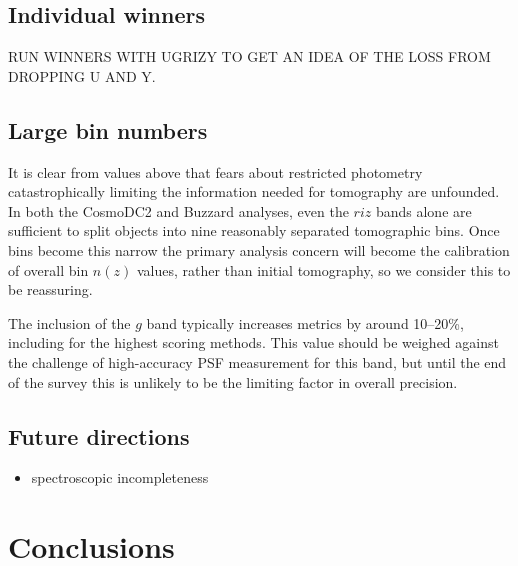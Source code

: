 \documentclass[twocolumn,twocolappendix]{aastex63}
\begin{document}
\subsection{Individual winners}

RUN WINNERS WITH UGRIZY TO GET AN IDEA OF THE LOSS FROM DROPPING U AND Y.

\subsection{Large bin numbers}

It is clear from values above that fears about restricted photometry catastrophically limiting
the information needed for tomography are unfounded.  In both the CosmoDC2 and Buzzard analyses,
even the $riz$ bands alone are sufficient to split objects into nine reasonably separated
tomographic bins.
Once bins become this narrow the primary analysis concern will become the calibration of overall
bin $n(z)$ values, rather than initial tomography, so we consider this to be reassuring.

The inclusion of the $g$ band typically increases metrics by around 10--20\%, including for the
highest scoring methods.  This value should be weighed against the challenge of high-accuracy
PSF measurement for this band, but until the end of the survey this is unlikely to be
the limiting factor in overall precision.

\subsection{Future directions}

\begin{itemize}
    \item spectroscopic incompleteness
\end{itemize}

\section{Conclusions}




\appendix
\end{document}
